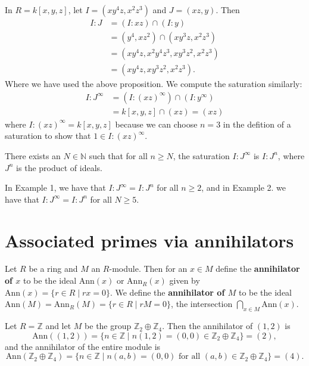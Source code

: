 \documentclass[12pt]{article}
\newenvironment{proposition}[2][Proposition]{\begin{trivlist}
\item[\hskip \labelsep {\bfseries #1}\hskip \labelsep {\bfseries #2.}]}{\end{trivlist}}
\newenvironment{example}[2][Example]{\begin{trivlist}
\item[\hskip \labelsep {\bfseries #1}\hskip \labelsep {\bfseries #2.}]}{\end{trivlist}}
\newenvironment{definition}[2][Definition]{\begin{trivlist}
\item[\hskip \labelsep {\bfseries #1}\hskip \labelsep {\bfseries #2.}]}{\end{trivlist}}
\newcommand{\N}{\mathbb{N}}
\newcommand{\Z}{\mathbb{Z}}
\newcommand{\ann}{\text{Ann}}
\begin{document}
\begin{example}{2}
	In $R = k[x,y,z]$, let $I = (xy^4z, x^2z^3)$ and $J = (xz,y)$. Then \begin{align*}
		I : J &= (I : xz) \cap (I : y) \\
		&= (y^4, xz^2) \cap (xy^3z, x^2 z^3) \\
		&= (xy^4z, x^2y^4z^3, xy^3z^2, x^2z^3) \\
		&= (xy^4z, xy^3z^2, x^2z^3).
	\end{align*} Where we have used the above proposition. We compute the saturation similarly: \begin{align*}
		I : J^\infty &= (I : (xz)^\infty) \cap (I : y^\infty) \\
		&= k[x,y,z] \cap (xz) = (xz)
	\end{align*} where $I: (xz)^\infty = k[x,y,z]$ because we can choose $n = 3$ in the defition of a saturation to show that $1 \in I : (xz)^\infty$. 
\end{example}


\begin{proposition}{4.4.9 \cite{cox2013ideals}}
	There exists an $N \in \N$ such that for all $n \geq N$, the saturation $I:J^\infty$ is $I:J^n$, where $J^n$ is the product of ideals. 
\end{proposition}


\noindent In Example 1, we have that $I: J^\infty = I: J^n$ for all $n \geq 2$, and in Example 2. we have that $I: J^\infty = I: J^n$ for all $N \geq 5$. 


\section{Associated primes via annihilators}

\begin{definition}{2}
	Let $R$ be a ring and $M$ an $R$-module. Then for an $x \in M$ define the \textbf{annihilator of $x$} to be the ideal $\ann(x)$ or $\ann_R(x)$ given by $\ann(x) = \{r \in R \mid rx = 0\}$. We define the \textbf{annihilator of $M$} to be the ideal $\ann(M) = \ann_R(M) = \{r \in R \mid rM = 0\}$, the intersection $\bigcap_{x \in M} \ann(x)$. 
\end{definition}


\begin{example}{3}
	Let $R = \Z$ and let $M$ be the group $\Z_2 \oplus \Z_4$. Then the annihilator of $(1,2)$ is \[ \ann( (1,2) ) = \{n \in \Z \mid n(1,2) = (0,0) \in \Z_2 \oplus \Z_4\} = (2), \] and the annihilator of the entire module is \[ \ann(\Z_2 \oplus \Z_4) = \{n \in \Z \mid n(a,b) = (0,0) \text{ for all } (a,b) \in \Z_2 \oplus \Z_4\} = (4). \]
\end{example}
\end{document}
